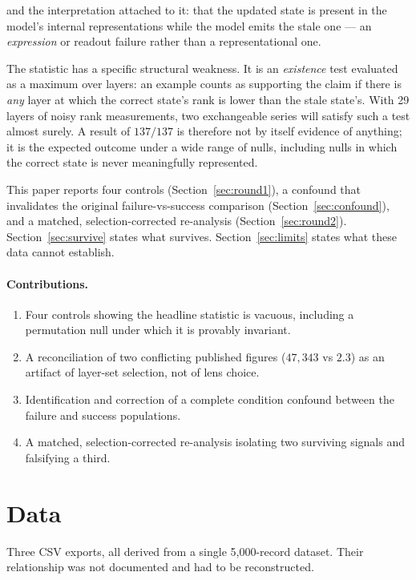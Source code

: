 \documentclass[11pt]{article}
\begin{document}
and the interpretation attached to it: that the updated state is present in the model's
internal representations while the model emits the stale one --- an \emph{expression} or
readout failure rather than a representational one.

The statistic has a specific structural weakness. It is an \emph{existence} test evaluated
as a maximum over layers: an example counts as supporting the claim if there is
\emph{any} layer at which the correct state's rank is lower than the stale state's. With 29
layers of noisy rank measurements, two exchangeable series will satisfy such a test almost
surely. A result of $137/137$ is therefore not by itself evidence of anything; it is the
expected outcome under a wide range of nulls, including nulls in which the correct state is
never meaningfully represented.

This paper reports four controls (Section~\ref{sec:round1}), a confound that invalidates the
original failure-vs-success comparison (Section~\ref{sec:confound}), and a matched,
selection-corrected re-analysis (Section~\ref{sec:round2}). Section~\ref{sec:survive} states
what survives. Section~\ref{sec:limits} states what these data cannot establish.

\paragraph{Contributions.}
\begin{enumerate}[leftmargin=*,itemsep=1pt]
\item Four controls showing the headline statistic is vacuous, including a permutation null
      under which it is provably invariant.
\item A reconciliation of two conflicting published figures ($47{,}343$ vs $2.3$) as an
      artifact of layer-set selection, not of lens choice.
\item Identification and correction of a complete condition confound between the failure and
      success populations.
\item A matched, selection-corrected re-analysis isolating two surviving signals and
      falsifying a third.
\end{enumerate}

\section{Data}
\label{sec:data}

Three CSV exports, all derived from a single 5{,}000-record dataset. Their relationship was
not documented and had to be reconstructed.
\end{document}
